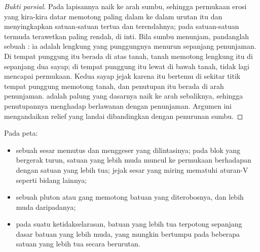 \begin{proof}[Bukti parsial]
Pada  lapisannya naik ke arah sumbu, sehingga permukaan erosi yang kira-kira datar memotong paling dalam ke dalam urutan itu dan menyingkapkan satuan-satuan tertua dan terendahnya; pada  satuan-satuan termuda terawetkan paling rendah, di inti. Bila sumbu menunjam, pandanglah  sebuah : ia adalah lengkung yang punggungnya menurun sepanjang penunjaman. Di tempat punggung itu berada di atas tanah, tanah memotong lengkung itu di sepanjang dua sayap; di tempat punggung itu lewat di bawah tanah,  tidak lagi mencapai permukaan. Kedua sayap jejak karena itu bertemu di sekitar titik tempat punggung memotong tanah, dan penutupan itu berada di arah penunjaman.  adalah palung yang dasarnya naik ke arah sebaliknya, sehingga penutupannya menghadap berlawanan dengan penunjaman. Argumen ini mengandaikan relief yang landai dibandingkan dengan penurunan sumbu.
\end{proof}

\begin{proposition}\label{prop:b1:geological-maps:cuts}
Pada peta:
\begin{itemize}
  \item sebuah sesar memutus dan menggeser  yang dilintasinya; pada blok yang bergerak turun, satuan yang lebih muda muncul ke permukaan berhadapan dengan satuan yang lebih tua; jejak sesar yang miring mematuhi aturan-V seperti bidang lainnya;
  \item sebuah pluton atau gang memotong  batuan yang diterobosnya, dan lebih muda daripadanya;
  \item pada suatu ketidakselarasan,  batuan yang lebih tua terpotong sepanjang dasar batuan yang lebih muda, yang mungkin bertumpu pada beberapa satuan yang lebih tua secara berurutan.
\end{itemize}
\end{proposition}

